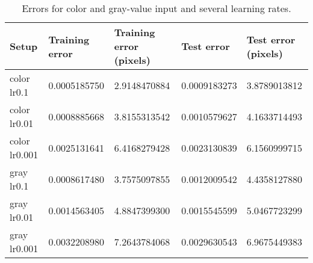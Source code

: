 \begin{table}[h!]
\centering
\footnotesize
\begin{tabular}{|l|l|l|l|l|}
	\hline
		\textbf{Setup} & \textbf{Training error} & \textbf{Training error (pixels)} & \textbf{Test error} & \textbf{Test error (pixels)}\\
	\hline
		color lr0.1		& 0.0005185750%
						& 2.9148470884%
						& 0.0009183273%
						& 3.8789013812%
						\\
	\hline
		color lr0.01 	& 0.0008885668%
						& 3.8155313542%
						& 0.0010579627%
						& 4.1633714493%
						\\
	\hline
		color lr0.001 	& 0.0025131641%
						& 6.4168279428%
						& 0.0023130839%
						& 6.1560999715%
						\\
	\hline
		gray lr0.1 		& 0.0008617480%
						& 3.7575097855%
						& 0.0012009542%
						& 4.4358127880%
						\\
	\hline
		gray lr0.01 	& 0.0014563405%
						& 4.8847399300%
						& 0.0015545599%
						& 5.0467723299%
						\\
	\hline
		gray lr0.001 	& 0.0032208980%
						& 7.2643784068%
						& 0.0029630543%
						& 6.9675449383%
						\\
	\hline
	\end{tabular}
	\normalsize
	\caption{Errors for color and gray-value input and several learning rates.}
	\label{tab:cnn_errors_color_vs_gray}
\end{table}
